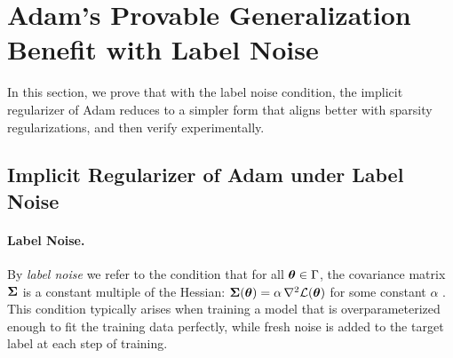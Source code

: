 \section{Adam's Provable Generalization Benefit with Label Noise}\label{sec:diag}
In this section, we prove that with the label noise condition, the implicit regularizer of Adam reduces to a simpler form that aligns better with sparsity regularizations, and then verify experimentally.
\subsection{Implicit Regularizer of Adam under Label Noise} \label{subsec:adam-label-noise}

\paragraph{Label Noise.} By \emph{label noise} we refer to the condition that for all  ${\bm{\theta}} \in \Gamma$, 
the covariance matrix ${\bm{\Sigma}}$ is a constant multiple of the Hessian:
${\bm{\Sigma}}({\bm{\theta}})=\alpha\,\nabla^2\mathcal{L}({\bm{\theta}})$ for some constant $\alpha$ \citep{blanc2020implicit}. 
This condition typically arises when training a model that is overparameterized enough to fit the training data perfectly,
while fresh noise is added to the target label at each step of training.

